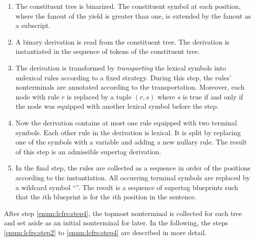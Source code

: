 \documentclass[../../document.tex]{subfiles}
\begin{document}
    \begin{enumerate}
        \item\label{enum:lcfrs:step1}
            The constituent tree is binarized.
            The constituent symbol at each position, where the fanout of the yield is greater than one, is extended by the fanout as a subscript.
        \item\label{enum:lcfrs:step2}
            A binary  derivation is read from the constituent tree.
            The derivation is instantiated in the sequence of tokens of the constituent tree.
        \item\label{enum:lcfrs:step3}
            The derivation is transformed by \emph{transporting} the lexical symbols into unlexical rules according to a fixed strategy.
            During this step, the rules' nonterminals are annotated according to the transportation.
            Moreover, each node with rule \(r\) is replaced by a tuple \((r, s)\) where \(s\) is true if and only if the node was equipped with another lexical symbol before the step.
        \item\label{enum:lcfrs:step4}
            Now the derivation contains at most one rule equipped with two terminal symbols. Each other rule in the derivation is lexical.
            It is split by replacing one of the symbols with a variable and adding a new nullary rule.
            The result of this step is an admissible  supertag derivation.
        \item
            In the final step, the rules are collected as a sequence in order of the positions according to the instantiation.
            All occurring terminal symbols are replaced by a wildcard symbol ``\tn{*}''.
            The result is a sequence of  supertag blueprints such that the \(i\)th blueprint is for the \(i\)th position in the sentence.
    \end{enumerate}
    After step \ref{enum:lcfrs:step4}, the topmost  nonterminal is collected for each tree and set aside as an initial nonterminal for later.
    In the following, the steps \ref{enum:lcfrs:step2} to \ref{enum:lcfrs:step4} are described in more detail.
\end{document}
